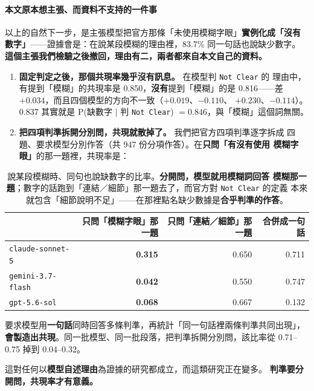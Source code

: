 \documentclass[11pt,a4paper]{ctexart}
\newcommand{\fn}[1]{\texttt{#1}}
\begin{document}
\paragraph{本文原本想主張、而資料不支持的一件事}
\label{sec:withdrawn}
以上的自然下一步，是主張模型把官方那條「未使用模糊字眼」\textbf{實例化成「沒有
數字」}——證據會是：在說某段模糊的理由裡，83.7\% 同一句話也說缺少數字。
\textbf{這個主張我們檢驗之後撤回，理由有二，兩者都來自本文自己的資料。}

\begin{enumerate}[leftmargin=2.2em, itemsep=3pt]
  \item \textbf{固定判定之後，那個共現率幾乎沒有訊息。} 在模型判 \fn{Not Clear} 的
        理由中，有提到「模糊」的共現率是 0.850，\textbf{沒有}提到「模糊」的是
        0.816——差 $+0.034$，而且四個模型的方向不一致（$+0.019$、$-0.110$、
        $+0.230$、$-0.114$）。0.837 其實就是 P(缺數字 $\mid$ 判 \fn{Not Clear})
        $= 0.846$，與「模糊」這個詞無關。
  \item \textbf{把四項判準拆開分別問，共現就散掉了。} 我們把官方四項判準逐字拆成
        四題、要求模型分別作答（共 947 份分項作答）。在\textbf{只問「有沒有使用
        模糊字眼」}的那一題裡，共現率是：
\end{enumerate}

\begin{table}[h]
\centering\small
\begin{tabular}{@{}lrrr@{}}
\toprule
 & 只問「模糊字眼」那一題 & 只問「連結／細節」那一題 & 合併成一句話 \\
\midrule
\fn{claude-sonnet-5} & \textbf{0.315} & 0.650 & 0.711 \\
\fn{gemini-3.7-flash} & \textbf{0.042} & 0.550 & 0.747 \\
\fn{gpt-5.6-sol} & \textbf{0.068} & 0.667 & 0.132 \\
\bottomrule
\end{tabular}
\caption{說某段模糊時、同句也說缺數字的比率。\textbf{分開問，模型就用模糊詞回答
模糊那一題}；數字的話跑到「連結／細節」那一題去了，而官方對 \fn{Not Clear} 的定義
本來就包含「細節說明不足」——在那裡點名缺少數據是\textbf{合乎判準的作答}。}
\end{table}

\begin{tcolorbox}[colback=gray!8, colframe=gray!55, title=一個方法學上的否定結果]
要求模型用\textbf{一句話}同時回答多條判準，再統計「同一句話裡兩條判準共同出現」，
\textbf{會製造出共現}。同一批模型、同一批段落，把判準拆開分別問，該比率從
0.71--0.75 掉到 0.04--0.32。

\medskip
這對任何以\textbf{模型自述理由}為證據的研究都成立，而這類研究正在變多。
\textbf{判準要分開問，共現率才有意義。}
\end{tcolorbox}
\end{document}
